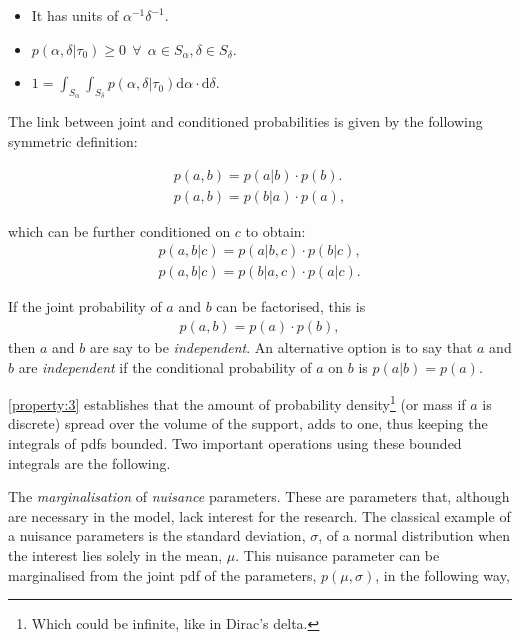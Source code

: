 \begin{itemize}
\item It has units of $\alpha^{-1} \delta^{-1}$.
\item $p(\alpha,\delta|\tau_0)\geq0 \ \ \forall \ \ \alpha\in S_{\alpha}, \delta\in S_{\delta}$. %
\item $1=\int_{S_{\alpha}} \int_{S_{\delta}} p(\alpha,\delta|\tau_0)\mathrm{d}\alpha\cdot \mathrm{d}\delta$.
\end{itemize}

The link between joint and conditioned probabilities is given by the following symmetric definition:

\begin{align}
p(a,b)=p(a|b)\cdot p(b).\nonumber \\
p(a,b)=p(b|a) \cdot p(a),
\end{align}

which can be further conditioned on $c$ to obtain:
\begin{align}
\label{eq:conditioned}
p(a,b|c)=p(a|b,c)\cdot p(b|c),\nonumber \\
p(a,b|c)=p(b|a,c) \cdot p(a|c).
\end{align}

If the joint probability of $a$ and $b$ can be factorised, this is
\begin{align}
p(a,b)=p(a)\cdot p(b),
\end{align}
then $a$ and $b$ are say to be \emph{independent}. An alternative option is to say that $a$ and $b$ are \emph{independent} if the conditional probability of $a$ on $b$ is $p(a|b)=p(a)$.


\ref{property:3} establishes that the amount of probability density\footnote{Which could be infinite, like in Dirac's delta.} (or mass if $a$ is discrete) spread over the volume of the support, adds to one, thus keeping the integrals of \glspl{pdf} bounded. Two important operations using these bounded integrals are the following.


The \emph{marginalisation} of \emph{nuisance} parameters. These are parameters that, although are necessary in the model, lack interest for the research. The classical example of a nuisance parameters is the standard deviation, $\sigma$, of a normal distribution when the interest lies solely in the mean, $\mu$. This nuisance parameter can be marginalised from the joint \gls{pdf} of the parameters, $p(\mu,\sigma)$, in the following way,

